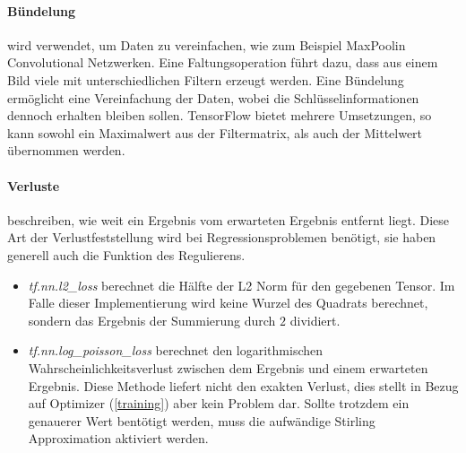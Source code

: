 \paragraph{Bündelung} wird verwendet, um Daten zu vereinfachen, wie zum Beispiel \glqq MaxPool\grqq in Convolutional Netzwerken. 
Eine Faltungsoperation führt dazu, dass aus einem Bild viele mit unterschiedlichen Filtern erzeugt werden.
Eine Bündelung ermöglicht eine Vereinfachung der Daten, wobei die Schlüsselinformationen dennoch erhalten bleiben sollen. 
TensorFlow bietet mehrere Umsetzungen, so kann sowohl ein Maximalwert aus der Filtermatrix, als auch der Mittelwert übernommen werden. 

\paragraph{Verluste} beschreiben, wie weit ein Ergebnis vom erwarteten Ergebnis entfernt liegt. 
Diese Art der Verlustfeststellung wird bei Regressionsproblemen benötigt, sie haben generell auch die Funktion des Regulierens.
\begin{itemize}
	\item \textit{tf.nn.l2\_loss} berechnet die Hälfte der L2 Norm für den gegebenen Tensor. %
	Im Falle dieser Implementierung wird keine Wurzel des Quadrats berechnet, sondern das Ergebnis der Summierung durch $2$ dividiert.
	\item \textit{tf.nn.log\_poisson\_loss} berechnet den logarithmischen Wahrscheinlichkeitsverlust zwischen dem Ergebnis und einem erwarteten Ergebnis. 
	Diese Methode liefert nicht den exakten Verlust, dies stellt in Bezug auf Optimizer (\ref{training}) aber kein Problem dar. 
	Sollte trotzdem ein genauerer Wert bentötigt werden, muss die aufwändige Stirling Approximation \cite{feller1968introduction} aktiviert werden. 
\end{itemize}

